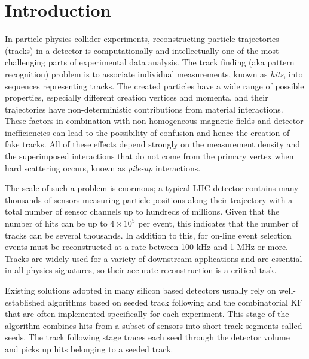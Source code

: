 
\chapter{Introduction}

\setlength\parindent{0pt}

In particle physics collider experiments, reconstructing particle trajectories (tracks) in a detector is computationally and intellectually one of the most challenging parts of experimental data analysis. The track finding (aka pattern recognition) problem is to associate individual measurements, known as \textit{hits}, into sequences representing tracks. The created particles have a wide range of possible properties, especially different creation vertices and momenta, and their trajectories have non-deterministic contributions from material interactions. These factors in combination with non-homogeneous magnetic fields and detector inefficiencies can lead to the possibility of confusion and hence the creation of fake tracks. All of these effects depend strongly on the measurement density and the superimposed interactions that do not come from the primary vertex when hard scattering occurs, known as \textit{pile-up} interactions.

The scale of such a problem is enormous; a typical \ac{LHC} detector contains many thousands of sensors measuring particle positions along their trajectory with a total number of sensor channels up to hundreds of millions. Given that the number of hits can be up to $4 \times 10^{5}$ per event, this indicates that the number of tracks can be several thousands. In addition to this, for on-line event selection events must be reconstructed at a rate between 100 kHz and 1 MHz or more. Tracks are widely used for a variety of downstream applications and are essential in all physics signatures, so their accurate reconstruction is a critical task.   

Existing solutions adopted in many silicon based detectors usually rely on well-established algorithms based on seeded track following and the combinatorial \ac{KF} \cite{AGOSTINELLI2003250} that are often implemented specifically for each experiment. This stage of the algorithm combines hits from a subset of sensors into short track segments called seeds. The track following stage traces each seed through the detector volume and picks up hits belonging to a seeded track.

